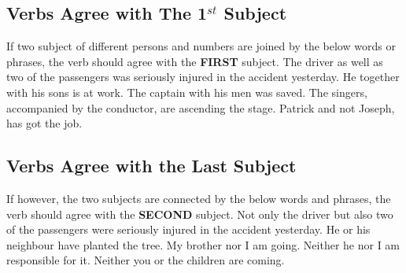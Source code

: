 \subsection{Verbs Agree with The 1$^{st}$ Subject}
If two subject of different persons and numbers are joined by the below words or
phrases, the verb should agree with the \textbf{FIRST} subject.
\newline
\newline
{\centering
{}
}
\newline
\newline
The driver as well as two of the passengers was seriously injured in the
accident yesterday.
\newline
\newline
He together with his sons is at work.
\newline
\newline
The captain with his men was saved.
\newline
\newline
The singers, accompanied by the conductor, are ascending the stage.
\newline
\newline
Patrick and not Joseph, has got the job.

\subsection{Verbs Agree with the Last Subject}
If however, the two subjects are connected by the below words and phrases, the
verb should agree with the \textbf{SECOND} subject.
\newline
\newline
{\centering
{}
}
\newline
\newline
Not only the driver but also two of the passengers were seriously injured in the
accident yesterday.
\newline
\newline
He or his neighbour have planted the tree.
\newline
\newline
My brother nor I am going.
\newline
\newline
Neither he nor I am responsible for it.
\newline
\newline
Neither you or the children are coming.

